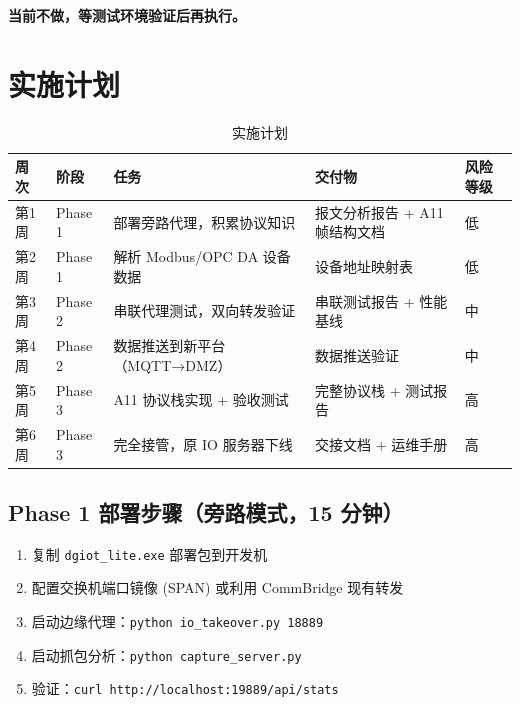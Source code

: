 \documentclass[12pt,a4paper]{ctexart}
\newcommand{\code}[1]{\texttt{\small #1}}
\begin{document}
\begin{center}
\textbf{当前不做，等测试环境验证后再执行。}
\end{center}

\section{实施计划}

\begin{table}[H]\centering
\caption{实施计划}
\begin{tabular}{p{1.2cm} p{2cm} p{3cm} p{3cm} p{3.5cm}}
\toprule
\textbf{周次} & \textbf{阶段} & \textbf{任务} & \textbf{交付物} & \textbf{风险等级} \\
\midrule
第1周 & Phase 1 & 部署旁路代理，积累协议知识 & 报文分析报告 + A11 帧结构文档 & 低 \\
第2周 & Phase 1 & 解析 Modbus/OPC DA 设备数据 & 设备地址映射表 & 低 \\
第3周 & Phase 2 & 串联代理测试，双向转发验证 & 串联测试报告 + 性能基线 & 中 \\
第4周 & Phase 2 & 数据推送到新平台（MQTT→DMZ） & 数据推送验证 & 中 \\
第5周 & Phase 3 & A11 协议栈实现 + 验收测试 & 完整协议栈 + 测试报告 & 高 \\
第6周 & Phase 3 & 完全接管，原 IO 服务器下线 & 交接文档 + 运维手册 & 高 \\
\bottomrule
\end{tabular}
\end{table}

\subsection{Phase 1 部署步骤（旁路模式，15 分钟）}

\begin{enumerate}[leftmargin=*]
  \item 复制 \code{dgiot\_lite.exe} 部署包到开发机
  \item 配置交换机端口镜像 (SPAN) 或利用 CommBridge 现有转发
  \item 启动边缘代理：\code{python io\_takeover.py 18889}
  \item 启动抓包分析：\code{python capture\_server.py}
  \item 验证：\code{curl http://localhost:19889/api/stats}
\end{enumerate}
\end{document}
